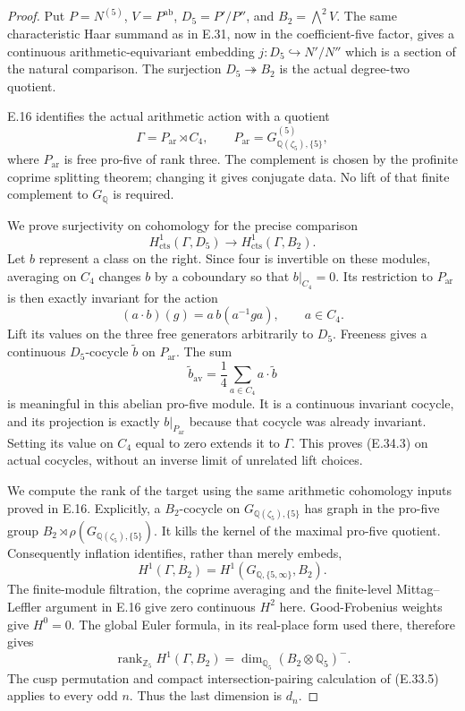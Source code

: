 \documentclass[11pt,oneside]{article}
\begin{document}
\begin{proof}
Put $P=N^{(5)}$, $V=P^{\mathrm{ab}}$,
$D_5=P'/P''$, and $B_2=\bigwedge^2V$.
The same characteristic Haar summand as in
E.31, now in the coefficient-five factor,
gives a continuous arithmetic-equivariant
embedding
$j:D_5\hookrightarrow N'/N''$ which is a
section of the natural comparison. The
surjection $D_5\twoheadrightarrow B_2$ is
the actual degree-two quotient.

E.16 identifies the actual arithmetic action
with a quotient
\[
 \Gamma=P_{\mathrm{ar}}\rtimes C_4,
 \qquad
 P_{\mathrm{ar}}=G_{\mathbb Q(\zeta_5),\{5\}}^{(5)},
 \tag{E.34.2}
\]
where $P_{\mathrm{ar}}$ is free pro-five of
rank three. The complement is chosen by
the profinite coprime splitting theorem;
changing it gives conjugate data. No lift
of that finite complement to $G_{\mathbb Q}$
is required.

We prove surjectivity on cohomology for the
precise comparison
\[
 H^1_{\mathrm{cts}}(\Gamma,D_5)
       \longrightarrow H^1_{\mathrm{cts}}(\Gamma,B_2).
 \tag{E.34.3}
\]
Let $b$ represent a class on the right.
Since four is invertible on these modules,
averaging on $C_4$ changes $b$ by a
coboundary so that $b|_{C_4}=0$.
Its restriction to $P_{\mathrm{ar}}$ is
then exactly invariant for the action
\[
 (a\cdot b)(g)=a\,b(a^{-1}ga),\qquad a\in C_4.
 \tag{E.34.4}
\]
Lift its values on the three free
generators arbitrarily to $D_5$.
Freeness gives a continuous $D_5$-cocycle
$\widetilde b$ on $P_{\mathrm{ar}}$.
The sum
\[
 \widetilde b_{\mathrm{av}}
       =\frac14\sum_{a\in C_4}a\cdot\widetilde b
 \tag{E.34.5}
\]
is meaningful in this abelian pro-five
module. It is a continuous invariant
cocycle, and its projection is exactly
$b|_{P_{\mathrm{ar}}}$ because that
cocycle was already invariant. Setting
its value on $C_4$ equal to zero extends
it to $\Gamma$. This proves (E.34.3)
on actual cocycles, without an inverse
limit of unrelated lift choices.

We compute the rank of the target using
the same arithmetic cohomology inputs
proved in E.16. Explicitly, a $B_2$-cocycle
on $G_{\mathbb Q(\zeta_5),\{5\}}$ has
graph in the pro-five group
$B_2\rtimes\rho(G_{\mathbb Q(\zeta_5),\{5\}})$.
It kills the kernel of the maximal
pro-five quotient. Consequently inflation
identifies, rather than merely embeds,
\[
 H^1(\Gamma,B_2)
       =H^1(G_{\mathbb Q,\{5,\infty\}},B_2).
 \tag{E.34.6}
\]
The finite-module filtration, the
coprime averaging and the finite-level
Mittag--Leffler argument in E.16 give
zero continuous $H^2$ here. Good-Frobenius
weights give $H^0=0$. The global Euler
formula, in its real-place form used
there, therefore gives
\[
 \operatorname{rank}_{\mathbb Z_5}H^1(\Gamma,B_2)
       =\dim_{\mathbb Q_5}(B_2\otimes\mathbb Q_5)^-.
 \tag{E.34.7}
\]
The cusp permutation and compact
intersection-pairing calculation of
(E.33.5) applies to every odd $n$.
Thus the last dimension is $d_n$.


\end{proof}
\end{document}
